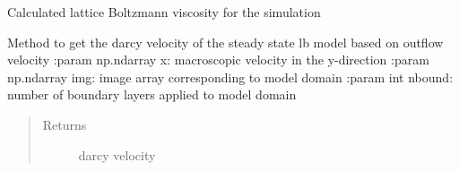 \documentclass[letterpaper,10pt,english]{sphinxmanual}
\begin{document}
\begin{fulllineitems}
\begin{fulllineitems}
\end{fulllineitems}


\begin{fulllineitems}
\label{\detokenize{index:lb_colloids.LB.LB_2Dpermeability.LB2DModel.viscosity}}
 \textendash{} Calculated lattice Boltzmann viscosity for the simulation

\end{fulllineitems}


\end{fulllineitems}


\begin{fulllineitems}
\label{\detokenize{index:lb_colloids.LB.LB_2Dpermeability.darcy_velocity}}
Method to get the darcy velocity of the steady state lb model
based on outflow velocity
:param np.ndarray x: macroscopic velocity in the y-direction
:param np.ndarray img: image array corresponding to model domain
:param int nbound: number of boundary layers applied to model domain
\begin{quote}\begin{description}
\item[{Returns}] \leavevmode
darcy velocity

\end{description}\end{quote}

\end{fulllineitems}

\end{document}
